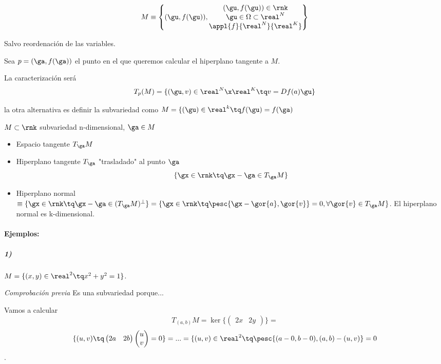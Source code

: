\[M\equiv \left\{(\gu,f(\gu)),\begin{matrix}
(\gu,f(\gu))\in \rnk\\
\gu \in \Omega\subset\real^N\\
 \appl{f}{\real^N}{\real^K}\end{matrix}\right\} \]

Salvo reordenación de las variables.

Sea $p=(\ga,f(\ga))$ el punto en el que queremos calcular el hiperplano tangente a $M$.

La caracterización será
\[T_p(M) = \{(\gu,v)\in\real^N\x\real^{K} \tq v = Df(a) \gu\}\]

\obs la otra alternativa es definir la subvariedad como $M = \{(\gu)\in\real^k \tq f(\gu) = f(\ga)$

\begin{defn}
$M\subset\rnk$ subvariedad n-dimensional, $\ga \in M$

\begin{itemize}
\item Espacio tangente $T_{\ga}M$
\item Hiperplano tangente $T_{\ga}$ "trasladado" al punto $\ga$
\[\{\gx \in \rnk \tq \gx-\ga \in T_{\ga}M\}\]
\item Hiperplano normal $\equiv \{\gx\in\rnk \tq \gx -\ga \in (T_{\ga}M)^{\bot}\} = \{\gx \in \rnk \tq \pesc{\gx-\gor{a},\gor{v}} = 0, \forall \gor{v}\in T_{\ga}M\}$. El hiperplano normal es k-dimensional.
\end{itemize}
\end{defn}


\paragraph{Ejemplos:}

\subparagraph{1)}

$ M = \{(x,y) \in \real^2 \tq x^2+y^2 = 1\}$.

\textit{Comprobación previa} Es una subvariedad porque...


Vamos a calcular \[T_{(a,b)}M = \ker \{\begin{pmatrix} 2x & 2y \end{pmatrix}\} =\]
\[ \{(u,v) \tq \begin{pmatrix}
2a & 2b
\end{pmatrix}\begin{pmatrix}
u\\v
\end{pmatrix} = 0\} = ... =  \{(u,v)\in \real^2 \tq \pesc{(a-0,b-0),(a,b)-(u,v)} = 0\].

